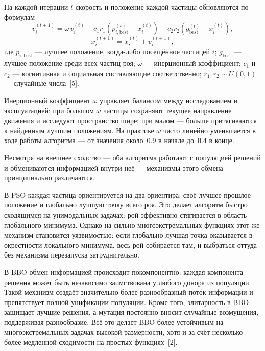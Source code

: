 \documentclass[14pt, russian]{scrartcl}
\begin{document}
На каждой итерации $t$ скорость и положение каждой частицы обновляются
по формулам
\begin{equation}
    v_i^{(t+1)} = \omega\, v_i^{(t)}
    + c_1 r_1 \!\left(p_{i,\text{best}}^{(t)} - x_i^{(t)}\right)
    + c_2 r_2 \!\left(g_{\text{best}}^{(t)} - x_i^{(t)}\right),
\end{equation}
\begin{equation}
    x_i^{(t+1)} = x_i^{(t)} + v_i^{(t+1)},
\end{equation}
где $p_{i,\text{best}}$ --- лучшее положение, когда-либо посещённое
частицей $i$; $g_{\text{best}}$ --- лучшее положение среди всех частиц
роя; $\omega$ --- инерционный коэффициент; $c_1$ и $c_2$ ---
когнитивная и социальная составляющие соответственно;
$r_1, r_2 \sim U(0,1)$ --- случайные числа~[5].

Инерционный коэффициент $\omega$ управляет балансом между исследованием
и эксплуатацией: при большом $\omega$ частицы сохраняют текущее
направление движения и исследуют пространство шире; при малом ---
больше притягиваются к найденным лучшим положениям. На практике
$\omega$ часто линейно уменьшается в ходе работы алгоритма --- от
значения около~$0.9$ в начале до~$0.4$ в конце.

Несмотря на внешнее сходство --- оба алгоритма работают с популяцией
решений и обмениваются информацией внутри неё --- механизмы этого
обмена принципиально различаются.

В PSO каждая частица ориентируется на два ориентира: своё лучшее
прошлое положение и глобально лучшую точку всего роя. Это делает
алгоритм быстро сходящимся на унимодальных задачах: рой эффективно
стягивается в область глобального минимума. Однако на сильно
многоэкстремальных функциях этот же механизм становится уязвимостью:
если глобально лучшая точка оказывается в окрестности локального
минимума, весь рой собирается там, и выбраться оттуда без механизма
перезапуска затруднительно.

В BBO обмен информацией происходит покомпонентно: каждая компонента
решения может быть независимо заимствована у любого донора из
популяции. Такой механизм создаёт значительно более разнообразный поток
информации и препятствует полной унификации популяции. Кроме того,
элитарность в BBO защищает лучшие решения, а мутация постоянно вносит
случайные возмущения, поддерживая разнообразие. Всё это делает BBO
более устойчивым на многоэкстремальных задачах высокой размерности,
хотя и за счёт несколько более медленной сходимости на простых
функциях~[2].
\end{document}
